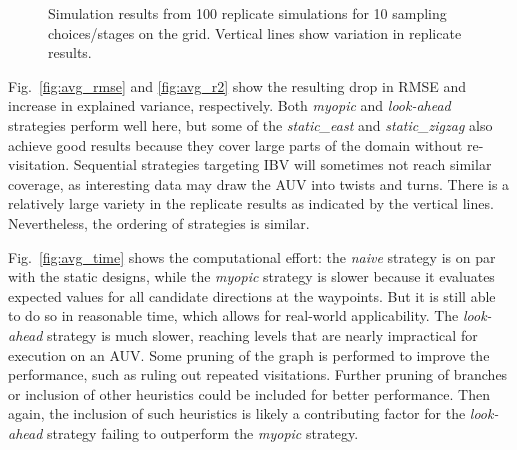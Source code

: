 \documentclass[aoas,preprint]{imsart}
\begin{document}
\begin{figure}[!h]
  \hfill {}
  \caption{Simulation results from 100 replicate simulations for 10
    sampling choices/stages on the grid. Vertical lines show variation
    in replicate results.}
\label{fig:sim_results}
\end{figure}

Fig.~\ref{fig:avg_rmse} and \ref{fig:avg_r2} show the resulting drop
in RMSE and increase in explained variance, respectively. Both
\textit{myopic} and \textit{look-ahead} strategies perform well here,
but some of the \textit{static\_east} and \textit{static\_zigzag} also
achieve good results because they cover large parts of the domain
without re-visitation. Sequential strategies targeting IBV will
sometimes not reach similar coverage, as interesting data may draw the
AUV into twists and turns. There is a relatively large variety in the
replicate results as indicated by the vertical lines. Nevertheless,
the ordering of strategies is similar.


Fig.~\ref{fig:avg_time} shows the computational effort: the
\textit{naive} strategy is on par with the static designs, while the
\textit{myopic} strategy is slower because it evaluates expected
values for all candidate directions at the waypoints. But it is still
able to do so in reasonable time, which allows for real-world
applicability. The \textit{look-ahead} strategy is much slower, reaching levels that
are nearly impractical for execution on an AUV. Some pruning of the
graph is performed to improve the performance, such as ruling out
repeated visitations. Further pruning of branches or inclusion of
other heuristics could be included for better performance. Then again,
the inclusion of such heuristics is likely a contributing factor for
the \textit{look-ahead} strategy failing to outperform the
\textit{myopic} strategy.
\end{document}
